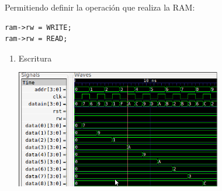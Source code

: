 \documentclass[11pt]{/home/hao/dev/org/latex-plantilla/IEEEtran}
\begin{document}
Permitiendo definir la operación que realiza la RAM:

\begin{verbatim}
ram->rw = WRITE;
ram->rw = READ;
\end{verbatim}
\begin{enumerate}
\item Escritura
\label{sec:org5088d85}
\begin{center}
\includegraphics[width=9cm]{data/6d/c8aff4-6c73-44ff-8d65-ce89a75c1214/screenshot-20170328-102212.png}
\end{center}


\end{enumerate}
\end{document}
